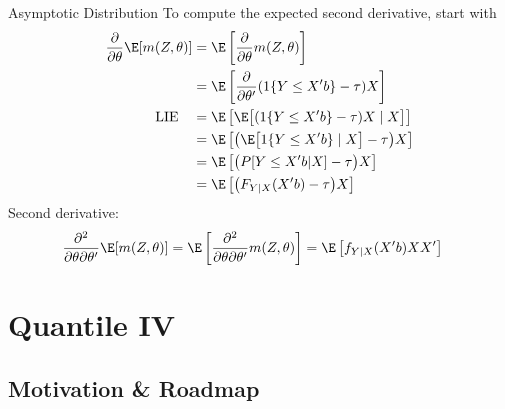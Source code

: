 \documentclass[aspectratio=169, handout]{beamer}
\begin{document}
{\footnotesize
\begin{frame}{Asymptotic Distribution}
To compute the expected second derivative, start with
\begin{align*}
  \frac{\partial}{\partial\theta}
  \E[m(Z,\theta)]
  &=
  \E\left[
    \frac{\partial}{\partial\theta}
    m(Z,\theta)
  \right]
  \\
  &=
  \E\left[
  \frac{\partial}{\partial\theta'}
  ({1}\{Y\leq X'b\}-\tau)X
  \right]
  \\
  \text{LIE}\quad
  &=
  \E\left[
    \E\big[
    ({1}\{Y\leq X'b\}-\tau)X
    \;|\;X
    \big]
  \right]
  \\
  &=
  \E\left[
    \big(
      \E\big[
      {1}\{Y\leq X'b\}
      \;|\;X
      \big]
      -\tau
    \big)X
  \right]
  \\
  &=
  \E\left[
    \big(
      P[Y\leq X'b |X]
      -\tau
    \big)X
  \right]
  \\
  &=
  \E\left[
    \big(
      F_{Y|X}(X'b)
      -\tau
    \big)X
  \right]
\end{align*}
Second derivative:
\begin{align*}
  \frac{\partial^2}{\partial \theta\partial\theta'}
  \E[m(Z,\theta)]
  &=
  \E\left[
    \frac{\partial^2}{\partial \theta\partial\theta'}
    m(Z,\theta)
  \right]
  =
  \E\left[
    f_{Y|X}(X'b)
    XX'
  \right]
\end{align*}

\end{frame}
}


\section{Quantile IV}

\subsection{Motivation \& Roadmap}
\end{document}
